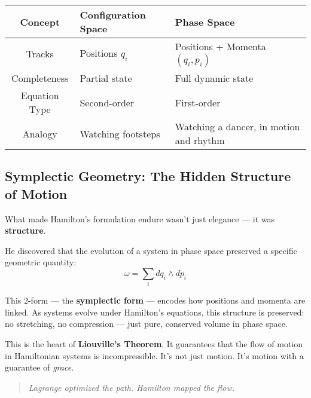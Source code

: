 \begin{center}
\begin{tabularx}{\textwidth}{|c|X|X|}
\hline
\textbf{Concept} & \textbf{Configuration Space} & \textbf{Phase Space} \\
\hline
Tracks & Positions \( q_i \) & Positions + Momenta \( (q_i, p_i) \) \\
\hline
Completeness & Partial state & Full dynamic state \\
\hline
Equation Type & Second-order & First-order \\
\hline
Analogy & Watching footsteps & Watching a dancer, in motion and rhythm \\
\hline
\end{tabularx}
\end{center}

\subsection{Symplectic Geometry: The Hidden Structure of Motion}

What made Hamilton’s formulation endure wasn’t just elegance — it was \textbf{structure}.

He discovered that the evolution of a system in phase space preserved a specific geometric quantity:
\[
\omega = \sum_i dq_i \wedge dp_i
\]

This 2-form — the \textbf{symplectic form} — encodes how positions and momenta are linked.  
As systems evolve under Hamilton’s equations, this structure is preserved:  
no stretching, no compression — just pure, conserved volume in phase space.

This is the heart of \textbf{Liouville’s Theorem}. It guarantees that the flow of motion in Hamiltonian systems is incompressible.  
It’s not just motion. It’s motion with a guarantee of \textit{grace}.

\begin{quote}
    \textit{Lagrange optimized the path.  
    Hamilton mapped the flow.}
\end{quote}
